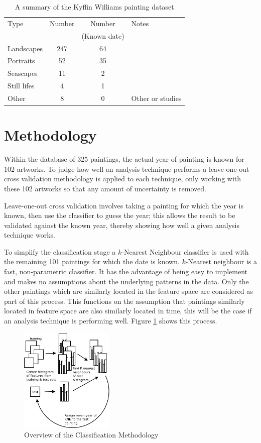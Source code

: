 \begin{table}[h]
\centering
\begin{tabular}{| l | c | c | p{3cm} |}
\hline
Type & Number & Number & Notes \\
  & & (Known date) &  \\
\hline
Landscapes  & 247 & 64 & \\
Portraits   &  52 & 35 & \\
Seascapes   &  11 &  2 & \\
Still lifes &   4 &  1 & \\
Other       &   8 &  0 & Other or studies \\
\hline
\end{tabular}
\caption{A summary of the Kyffin Williams painting dataset
\label{summary_t}}
\end{table}

\section{Methodology}

Within the database of 325 paintings, the actual year of painting is known for 102 artworks. 
To judge how well an analysis technique performs a leave-one-out cross validation methodology is
applied to each technique, only working with these 102 artworks so that any amount of uncertainty 
is removed.

Leave-one-out cross validation involves taking a painting for which the year is known, then use
the classifier to guess the year; this allows the result to be validated against the known year,
thereby showing how well a given analysis technique works.

To simplify the classification stage a $k$-Nearest Neighbour classifier is used with the remaining
101 paintings for which the date is known. $k$-Nearest neighbour is a fast, non-parametric classifier.
It has the advantage of being easy to implement and makes no assumptions about the underlying patterns in the data.
Only the other paintings which are similarly located in the feature space are considered as part of this process.
This functions on the assumption that paintings similarly located in feature space are also similarly located in time,
this will be the case if an analysis technique is performing well. Figure \ref{img:classification-overview} shows this process.

\begin{figure}[h]
\centering
\includegraphics[width=0.4\textwidth]{img/kyffin_overview.pdf}
\caption{Overview of the Classification Methodology}
\label{img:classification-overview}
\end{figure}


